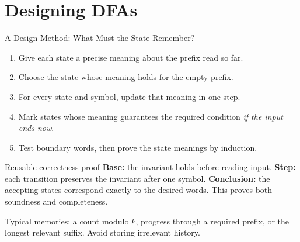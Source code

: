\documentclass[10pt]{beamer}
\begin{document}
\section{Designing DFAs}

\begin{frame}{A Design Method: What Must the State Remember?}
  \small
  \begin{enumerate}
    \item Give each state a precise meaning about the prefix read so far.
    \item Choose the state whose meaning holds for the empty prefix.
    \item For every state and symbol, update that meaning in one step.
    \item Mark states whose meaning guarantees the required condition
      \emph{if the input ends now}.
    \item Test boundary words, then prove the state meanings by induction.
  \end{enumerate}
  \pause
  \begin{block}{Reusable correctness proof}
    \textbf{Base:} the invariant holds before reading input.
    \textbf{Step:} each transition preserves the invariant after one symbol.
    \textbf{Conclusion:} the accepting states correspond exactly to the
    desired words. This proves both soundness and completeness.
  \end{block}
  Typical memories: a count modulo $k$, progress through a required prefix,
  or the longest relevant suffix. Avoid storing irrelevant history.
\end{frame}
\end{document}
